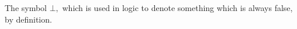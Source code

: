 The symbol $ \bot , $ which is used in logic to denote something which is
always false, by definition.
